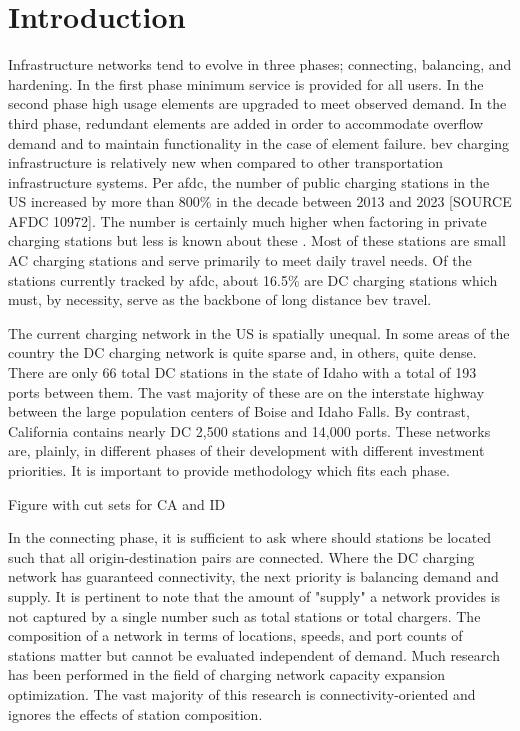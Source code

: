 \section{Introduction}

Infrastructure networks tend to evolve in three phases; connecting, balancing, and hardening. In the first phase minimum service is provided for all users. In the second phase high usage elements are upgraded to meet observed demand. In the third phase, redundant elements are added in order to accommodate overflow demand and to maintain functionality in the case of element failure. \gls{bev} charging infrastructure is relatively new when compared to other transportation infrastructure systems. Per \gls{afdc}, the number of public charging stations in the US increased by more than 800\% in the decade between 2013 and 2023 [SOURCE AFDC 10972]. The number is certainly much higher when factoring in private charging stations but less is known about these \cite{Davis_2022}. Most of these stations are small AC charging stations and serve primarily to meet daily travel needs. Of the stations currently tracked by \gls{afdc}, about 16.5\% are DC charging stations which must, by necessity, serve as the backbone of long distance \gls{bev} travel. 

The current charging network in the US is spatially unequal. In some areas of the country the DC charging network is quite sparse and, in others, quite dense. There are only 66 total DC stations in the state of Idaho with a total of 193 ports between them. The vast majority of these are on the interstate highway between the large population centers of Boise and Idaho Falls. By contrast, California contains nearly DC 2,500 stations and 14,000 ports. These networks are, plainly, in different phases of their development with different investment priorities. It is important to provide methodology which fits each phase.

Figure with cut sets for CA and ID

In the connecting phase, it is sufficient to ask where should stations be located such that all origin-destination pairs are connected. Where the DC charging network has guaranteed connectivity, the next priority is balancing demand and supply. It is pertinent to note that the amount of "supply" a network provides is not captured by a single number such as total stations or total chargers. The composition of a network in terms of locations, speeds, and port counts of stations matter but cannot be evaluated independent of demand. Much research has been performed in the field of charging network capacity expansion optimization. The vast majority of this research is connectivity-oriented and ignores the effects of station composition.